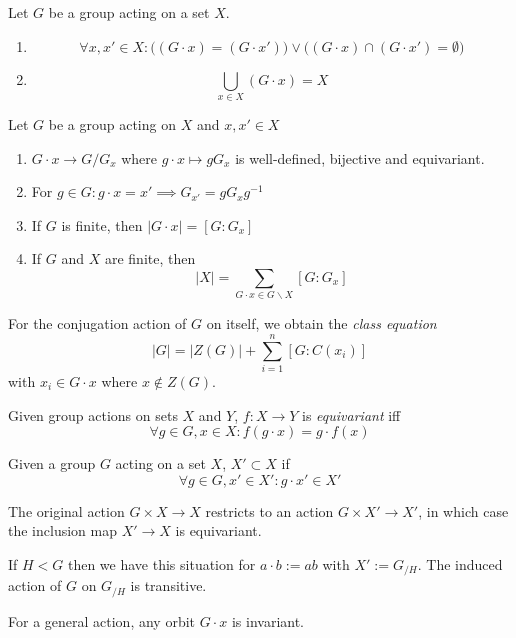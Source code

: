 \begin{proposition}
   Let \(G\) be a group acting on a set \(X\).
   \begin{enumerate}[label=\roman*, align=Center]
      \item \[\forall x, x' \in X: \big((G \cdot x) = (G \cdot x')\big) \lor \big((G \cdot x) \cap (G \cdot x') = \emptyset\big)\]
      \item \[\bigcup_{x \in X} (G \cdot x) = X\]
   \end{enumerate}
\end{proposition}

\begin{proposition}
   Let \(G\) be a group acting on \(X\) and \(x, x' \in X\)
   \begin{enumerate}[label=\roman*, align=Center]
      \item \(G \cdot x \to G/G_x\) where \(g \cdot x \mapsto gG_x\) is well-defined, bijective and equivariant.
      \item For \(g \in G: g \cdot x = x' \implies G_{x'} = gG_xg^{-1}\)
      \item If \(G\) is finite, then \(|G \cdot x| = [G : G_x]\)
      \item If \(G\) and \(X\) are finite, then
         \[|X| = \sum_{G \cdot x \in G \backslash X} [G : G_x]\]
   \end{enumerate}
\end{proposition}
\begin{remark}
   For the conjugation action of \(G\) on itself, we obtain the \emph{class equation}
   \[|G| = |Z(G)| + \sum_{i=1}^n [G : C(x_i)]\]
   with \(x_i \in G \cdot x\) where \(x \not\in Z(G)\).
\end{remark}

\begin{definition}
   Given group actions on sets \(X\) and \(Y\), \(f: X \to Y\) is \emph{equivariant} iff
   \[\forall g \in G, x \in X: f(g \cdot x) = g \cdot f(x)\]
\end{definition}

\begin{definition}
   Given a group \(G\) acting on a set \(X\), \(X' \subset X\) if
   \[\forall g \in G, x' \in X': g \cdot x' \in X'\]
\end{definition}
\begin{remark}
   The original action \(G \times X \to X\) restricts to an action \(G \times X' \to X'\), in which case the inclusion map \(X' \to X\) is equivariant.
\end{remark}
\begin{example}
   If \(H < G\) then we have this situation for \(a \cdot b := ab\) with \(X' := G_{/H}\).
   The induced action of \(G\) on \(G_{/H}\) is transitive.

   For a general action, any orbit \(G \cdot x\) is invariant.
\end{example}

